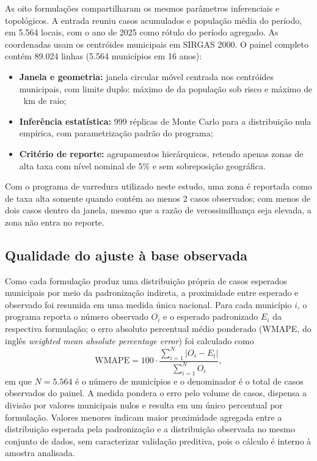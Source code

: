 As oito formulações compartilharam os mesmos parâmetros inferenciais e topológicos. A entrada reuniu casos acumulados e população média do período, em 5.564 locais, com o ano de 2025 como rótulo do período agregado. As coordenadas usam os centróides municipais em SIRGAS 2000. O painel completo contém 89.024 linhas (5.564 municípios em 16 anos):
\begin{itemize}
    \item \textbf{Janela e geometria:} janela circular móvel centrada nos centróides municipais, com limite duplo: máximo de \ScanJanelaPop{} da população sob risco e máximo de \ScanRaioMaxKm{}~km de raio;
    \item \textbf{Inferência estatística:} 999 réplicas de Monte Carlo para a distribuição nula empírica, com parametrização padrão do programa;
    \item \textbf{Critério de reporte:} agrupamentos hierárquicos, retendo apenas zonas de alta taxa com nível nominal de 5\% e sem sobreposição geográfica.
\end{itemize}
Com o programa de varredura utilizado neste estudo, uma zona é reportada como de taxa alta somente quando contém ao menos 2 casos observados; com menos de dois casos dentro da janela, mesmo que a razão de verossimilhança seja elevada, a zona não entra no reporte.

\subsection{Qualidade do ajuste à base observada}
\label{subsec:wmape}

Como cada formulação produz uma distribuição própria de casos esperados municipais por meio da padronização indireta, a proximidade entre esperado e observado foi resumida em uma medida única nacional. Para cada município $i$, o programa reporta o número observado $O_i$ e o esperado padronizado $E_i$ da respectiva formulação; o erro absoluto percentual médio ponderado (WMAPE, do inglês \textit{weighted mean absolute percentage error}) foi calculado como
\begin{equation}
\mathrm{WMAPE}
=
100 \cdot \frac{\sum_{i=1}^{N} \lvert O_i - E_i \rvert}{\sum_{i=1}^{N} O_i},
\label{eq:wmape}
\end{equation}
em que $N = 5.564$ é o número de municípios e o denominador é o total de casos observados do painel. A medida pondera o erro pelo volume de casos, dispensa a divisão por valores municipais nulos e resulta em um único percentual por formulação. Valores menores indicam maior proximidade agregada entre a distribuição esperada pela padronização e a distribuição observada no mesmo conjunto de dados, sem caracterizar validação preditiva, pois o cálculo é interno à amostra analisada.

